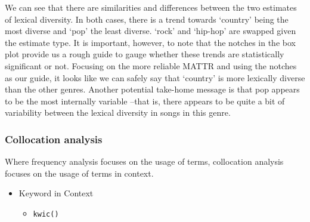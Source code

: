 \documentclass[
]{article}
\providecommand{\tightlist}{%
  \setlength{\itemsep}{0pt}\setlength{\parskip}{0pt}}
\begin{document}
We can see that there are similarities and differences between the two estimates of lexical diversity. In both cases, there is a trend towards `country' being the most diverse and `pop' the least diverse. `rock' and `hip-hop' are swapped given the estimate type. It is important, however, to note that the notches in the box plot provide us a rough guide to gauge whether these trends are statistically significant or not. Focusing on the more reliable MATTR and using the notches as our guide, it looks like we can safely say that `country' is more lexically diverse than the other genres. Another potential take-home message is that pop appears to be the most internally variable --that is, there appears to be quite a bit of variability between the lexical diversity in songs in this genre.

\hypertarget{collocation-analysis}{%
\subsubsection{Collocation analysis}\label{collocation-analysis}}

Where frequency analysis focuses on the usage of terms, collocation analysis focuses on the usage of terms in context.

\begin{itemize}
\tightlist
\item
  Keyword in Context

  \begin{itemize}
  \tightlist
  \item
    \texttt{kwic()}
  \end{itemize}
\end{itemize}
\end{document}
